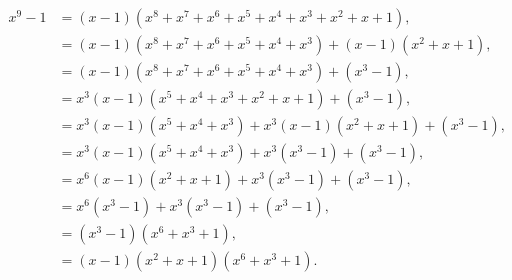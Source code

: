 \begin{align}
	x^9-1 &= (x-1)(x^8 + x^7 + x^6 + x^5 + x^4 + x^3 + x^2 + x + 1),\nonumber\\
	&=(x-1)\left(x^8 + x^7 + x^6 + x^5 + x^4 + x^3 \right) + (x-1)(x^2 + x + 1),\nonumber\\
	&=(x-1)\left(x^8 + x^7 + x^6 + x^5 + x^4 + x^3 \right) + (x^3-1),\nonumber\\
	&=x^3(x-1)\left(x^5 + x^4 + x^3 + x^2 + x + 1 \right) + (x^3-1),\nonumber\\
	&=x^3(x-1)\left(x^5 + x^4 + x^3 \right) + x^3(x-1)(x^2 + x + 1) + (x^3-1),\nonumber\\
	&=x^3(x-1)\left(x^5 + x^4 + x^3 \right) + x^3(x^3-1) + (x^3-1),\nonumber\\
	&=x^6(x-1)\left(x^2 + x + 1 \right) + x^3(x^3-1) + (x^3-1),\nonumber\\
	&=x^6(x^3-1) + x^3(x^3-1) + (x^3-1),\nonumber\\
	&=(x^3-1)\left(x^6 + x^3 + 1\right),\nonumber\\
	\label{eq:factorization}
	&=(x-1)(x^2 + x + 1)(x^6 + x^3 + 1).
\end{align}


